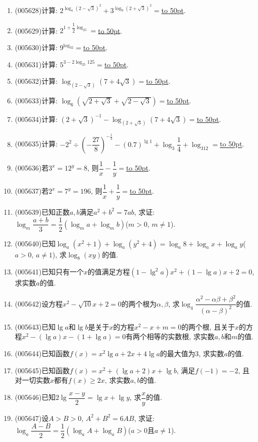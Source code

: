 \documentclass[10pt,a4paper]{article}
\newcommand{\blank}[1]{\underline{\hbox to #1pt{}}}
\begin{document}
\begin{enumerate}[1.]
\item {\tiny (005628)}计算: $2^{\log_4(2-\sqrt 3)^2}+3^{\log_9(2+\sqrt 3)^2}=$\blank{50}.
\item {\tiny (005629)}计算: $2^{1+\dfrac 12\log_25}=$\blank{50}.
\item {\tiny (005630)}计算: $9^{\log_32}=$\blank{50}.
\item {\tiny (005631)}计算: $5^{3-2\log_{25}125}=$\blank{50}.
\item {\tiny (005632)}计算: $\log_{(2-\sqrt 3)}(7+4\sqrt 3)=$\blank{50}.
\item {\tiny (005633)}计算: $\log_6(\sqrt {2+\sqrt 3}+\sqrt {2-\sqrt 3})=$\blank{50}.
\item {\tiny (005634)}计算: $(2+\sqrt 3)^{-1}-\log_{(2+\sqrt 3)}(7+4\sqrt 3)=$\blank{50}.
\item {\tiny (005635)}计算: $-2^2\div (-\dfrac{27}8)^{-\frac 13}-(0.7)^{\lg 1}+\log_3\dfrac 14+\log_312=$\blank{50}.
\item {\tiny (005636)}若$3^x=12^y=8$, 则$\dfrac 1x-\dfrac 1y=$\blank{50}.
\item {\tiny (005637)}若$2^x=7^y=196$, 则$\dfrac 1x+\dfrac 1y=$\blank{50}.
\item {\tiny (005639)}已知正数$a,b$满足$a^2+b^2=7ab$, 求证: $\log_m\dfrac{a+b}3=\dfrac 12(\log_ma+\log_mb)$($m>0$, $m\ne 1$).
\item {\tiny (005640)}已知$\log_a(x^2+1)+\log_a(y^2+4)=\log_a8+\log_ax+\log_ay$($a>0$, $a\ne 1$), 求$\log_8(xy)$的值.
\item {\tiny (005641)}已知只有一个$x$的值满足方程$(1-\lg ^2a)x^2+(1-\lg a)x+2=0$, 求实数$a$的值.
\item {\tiny (005642)}设方程$x^2-\sqrt {10}x+2=0$的两个根为$\alpha ,\beta$, 求$\log_4\dfrac{\alpha ^2-\alpha \beta +\beta ^2}{(\alpha -\beta)^2}$的值.
\item {\tiny (005643)}已知$\lg a$和$\lg b$是关于$x$的方程$x^2-x+m=0$的两个根, 且关于$x$的方程$x^2-(\lg a)x-(1+\lg a)=0$有两个相等的实数根, 求实数$a,b$和$m$的值.
\item {\tiny (005644)}已知函数$f(x)=x^2\lg a+2x+4\lg a$的最大值为3, 求实数$a$的值.
\item {\tiny (005645)}已知函数$f(x)=x^2+(\lg a+2)x+\lg b$, 满足$f(-1)=-2$, 且对一切实数$x$都有$f(x)\ge 2x$, 求实数$a,b$的值.
\item {\tiny (005646)}已知$2\lg \dfrac{x-y}2=\lg x+\lg y$, 求$\dfrac xy$的值.
\item {\tiny (005647)}设$A>B>0$, $A^2+B^2=6AB$, 求证: $\log_a\dfrac{A-B}2=\dfrac 12(\log_aA+\log_aB)$($a>0$且$a\ne 1$).

\end{enumerate}
\end{document}
